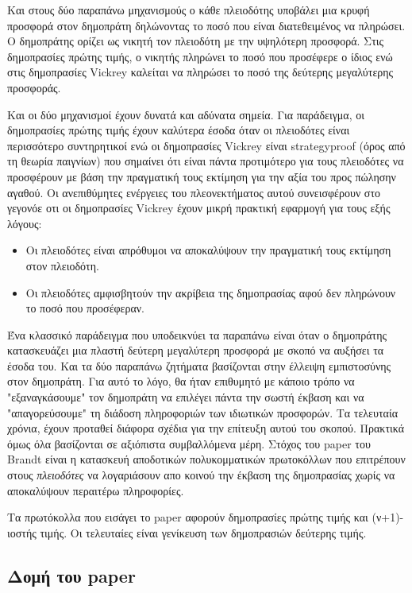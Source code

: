 \documentclass[a4paper,11pt]{article}
\begin{document}
Και στους δύο παραπάνω μηχανισμούς ο κάθε πλειοδότης υποβάλει μια κρυφή προσφορά στον δημοπράτη δηλώνοντας το
ποσό που είναι διατεθειμένος να πληρώσει. Ο δημοπράτης ορίζει ως νικητή τον πλειοδότη με την υψηλότερη
προσφορά. Στις δημοπρασίες πρώτης τιμής, ο νικητής πληρώνει το ποσό που προσέφερε ο ίδιος ενώ στις δημοπρασίες
Vickrey καλείται να πληρώσει το ποσό της δεύτερης μεγαλύτερης προσφοράς.

Και οι δύο μηχανισμοί έχουν δυνατά και αδύνατα σημεία. Για παράδειγμα, οι δημοπρασίες πρώτης τιμής έχουν
καλύτερα έσοδα όταν οι πλειοδότες είναι περισσότερο συντηρητικοί ενώ οι δημοπρασίες Vickrey είναι
strategyproof (όρος από τη θεωρία παιγνίων) που σημαίνει ότι είναι πάντα προτιμότερο για τους πλειοδότες να
προσφέρουν με βάση την πραγματική τους εκτίμηση για την αξία του προς πώλησην αγαθού. Οι ανεπιθύμητες
ενέργειες του πλεονεκτήματος αυτού συνεισφέρουν στο γεγονόε οτι οι δημοπρασίες Vickrey έχουν μικρή πρακτική
εφαρμογή για τους εξής λόγους:

\begin{itemize}
	\item Οι πλειοδότες είναι απρόθυμοι να αποκαλύψουν την πραγματική τους εκτίμηση στον πλειοδότη. 
	\item Οι πλειοδότες αμφισβητούν την ακρίβεια της δημοπρασίας αφού δεν πληρώνουν το ποσό που προσέφεραν.
\end{itemize}

Ένα κλασσικό παράδειγμα που υποδεικνύει τα παραπάνω είναι όταν ο δημοπράτης κατασκευάζει μια πλαστή δεύτερη
μεγαλύτερη προσφορά με σκοπό να αυξήσει τα έσοδα του. Και τα δύο παραπάνω ζητήματα βασίζονται στην έλλειψη
εμπιστοσύνης στον δημοπράτη. Για αυτό το λόγο, θα ήταν επιθυμητό με κάποιο τρόπο να "εξαναγκάσουμε" τον
δημοπράτη να επιλέγει πάντα την σωστή έκβαση και να "απαγορεύσουμε" τη διάδοση πληροφοριών των ιδιωτικών
προσφορών. Τα τελευταία χρόνια, έχουν προταθεί διάφορα σχέδια για την επίτευξη αυτού του σκοπού. Πρακτικά όμως
όλα βασίζονται σε αξιόπιστα συμβαλλόμενα μέρη. Στόχος του paper του Brandt είναι η κατασκευή αποδοτικών
πολυκομματικών πρωτοκόλλων που επιτρέπουν στους \emph{πλειοδότες} να λογαριάσουν απο κοινού την έκβαση της
δημοπρασίας χωρίς να αποκαλύψουν περαιτέρω πληροφορίες.

Τα πρωτόκολλα που εισάγει το paper αφορούν δημοπρασίες πρώτης τιμής και (ν+1)-ιοστής τιμής. Οι τελευταίες
είναι γενίκευση των δημοπρασιών δεύτερης τιμής.

\subsection{Δομή του paper}
\end{document}
